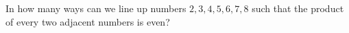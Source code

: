 In how many ways can we line up numbers $2, 3, 4, 5, 6, 7, 8$ such that the product of every two adjacent numbers is even?
